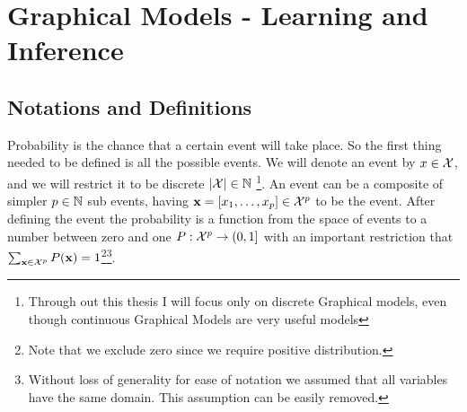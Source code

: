 \section{Graphical Models - Learning and Inference}
\subsection{Notations and Definitions}
\label{sec:def}
Probability is the chance that a certain event will take place.
So the first thing needed to be defined is  all the possible events.
We will denote an event by $x \in {\cal X}$, and we will restrict it to be discrete $ |{\cal X}| \in \mathbb{N}$
\footnote{Through out this thesis I will focus only on discrete Graphical models, even though continuous Graphical Models are very useful models}.
An event can be a composite of simpler $p \in \mathbb{N}$ sub events, having ${\bf x} = [x_1, \ldots, x_{p}] \in {\cal X}^p$ to be the event.
After defining the event the probability is  a function from the space of events to a number between zero and one $P:{\cal X}^{p} \to (0,1]$ with an important restriction that $\sum_{{\bf x} \in {\cal X}^{p}} P({\bf x}) = 1$\footnote{Note that we exclude zero since we require positive distribution.}\footnote{Without loss of generality for ease of notation we assumed that all variables have the same domain. This assumption can be easily removed.}.

